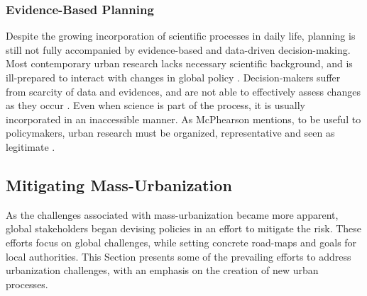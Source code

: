 {{        \subsubsection{Evidence-Based Planning}
        {
            Despite the growing incorporation of scientific processes in daily life, planning is still not fully accompanied by evidence-based and data-driven decision-making. Most contemporary urban research lacks necessary scientific background, and is ill-prepared to interact with changes in global policy \cite{McPhearson2016, habitat2016new, Inostroza2015}. Decision-makers suffer from scarcity of data and evidences, and are not able to effectively assess changes as they occur \cite{bulmer_how_2001}. Even when science is part of the process, it is usually incorporated in an inaccessible manner. As McPhearson mentions, to be useful to policymakers, urban research must be organized, representative and seen as legitimate \cite{McPhearson2016}.
        }
    }

    \subsection{Mitigating Mass-Urbanization}
    {
        As the challenges associated with mass-urbanization became more apparent, global stakeholders began devising policies in an effort to mitigate the risk. These efforts focus on global challenges, while setting concrete road-maps and goals for local authorities. This Section presents some of the prevailing efforts to address urbanization challenges, with an emphasis on the creation of new urban processes.

}}
